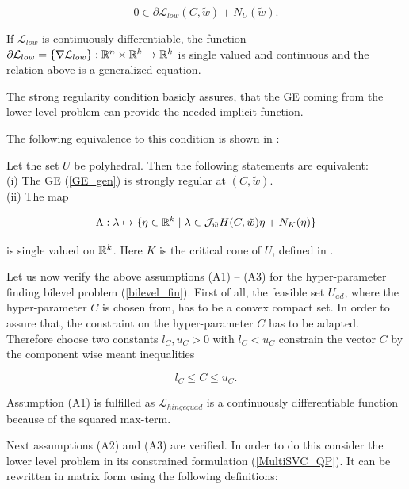 \[ 0 \in \partial \mathcal{L}_{low}(C,\tilde{w}) + N_U(\tilde{w}). \]

If \(\mathcal{L}_{low}\) is continuously differentiable, the function \(\partial \mathcal{L}_{low} = \{\nabla \mathcal{L}_{low}\} : \mathbb{R}^n\times\mathbb{R}^k \to \mathbb{R}^k\) is single valued and continuous and the relation above is a generalized equation.

The strong regularity condition basicly assures, that the GE coming from the lower level problem can provide the needed implicit function.

The following equivalence to this condition is shown in \cite{Outrata1998}:

\begin{proposition}
\label{strong_reg}
	Let the set \(U\) be polyhedral. Then the following statements are equivalent:\\
	(i) The GE (\ref{GE_gen}) is strongly regular at \((C,\tilde{w})\).\\
	(ii) The map
	
		\[ \Lambda : \lambda \mapsto \{\eta \in \mathbb{R}^k \mid \lambda \in \mathcal{J}_{\tilde{w}}H(C,\tilde{w}) \eta + N_K(\eta)\} \]
	
		is single valued on \(\mathbb{R}^{k}\).
		Here \(K\) is the critical cone of \(U\), defined in \cite[equation (2.50), p. 37]{Outrata1998}.
\end{proposition}



Let us now verify the above assumptions (A1) -- (A3) for the hyper-parameter finding bilevel problem (\ref{bilevel_fin}).
First of all, the feasible set \(U_{ad}\), where the hyper-parameter \(C\) is chosen from, has to be a convex compact set. In order to assure that, the constraint on the hyper-parameter \(C\) has to be adapted.
Therefore choose two constants \(l_C, u_C > 0\) with \(l_C < u_C\) constrain the vector \(C\) by the component wise meant inequalities

\[ l_C \leq C \leq u_C. \]

Assumption (A1) is fulfilled as \(\mathcal{L}_{hingequad}\) is a continuously differentiable function because of the squared max-term.

Next assumptions (A2) and (A3) are verified. In order to do this consider the lower level problem in its constrained formulation (\ref{MultiSVC_QP}).
It can be rewritten in matrix form using the following definitions:

